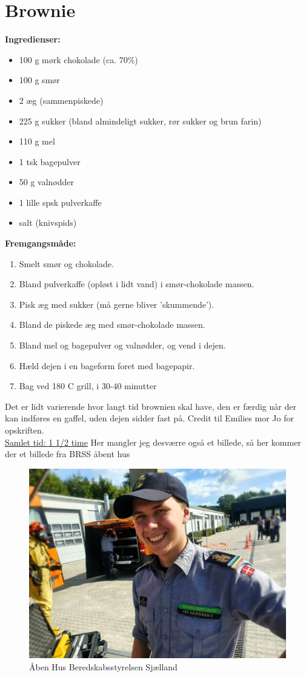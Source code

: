 \documentclass{book}
\begin{document}
\newpage \section{Brownie}
\begin{minipage}[t]{0.5\textwidth}
\textbf{Ingredienser:}
\begin{itemize}
  \item 100 g mørk chokolade (ca. 70\%)
  \item 100 g smør
  \item 2 æg (sammenpiskede)
  \item 225 g sukker (bland almindeligt sukker, rør sukker og brun farin)
  \item 110 g mel
  \item 1 tsk bagepulver
  \item 50 g valnødder
  \item 1 lille spsk pulverkaffe
  \item salt (knivspids)
\end{itemize}
\end{minipage}
\begin{minipage}[t]{0.5\textwidth}
\textbf{Fremgangsmåde:}
\begin{enumerate}
    \item Smelt smør og chokolade. 
    \item Bland pulverkaffe (opløst i lidt vand) i smør-chokolade massen.
    \item Pisk æg med sukker (må gerne bliver ’skummende’).
    \item Bland de piskede æg med smør-chokolade massen.
    \item Bland mel og bagepulver og valnødder, og vend i dejen.
    \item Hæld dejen i en bageform foret med bagepapir.
    \item Bag ved 180 \degree C grill, i 30-40 minutter
\end{enumerate}
\end{minipage}
Det er lidt varierende hvor langt tid brownien skal have, den er færdig når der kan indføres en gaffel, uden dejen sidder fast på. Credit til Emilies mor Jo for opskriften.
\\ \underline{Samlet tid: 1 1/2 time}
\newpage 
Her mangler jeg desværre også et billede, så her kommer der et billede fra BRSS åbent hus 
\begin{figure}
    \centering
    \includegraphics[width=0.5\linewidth]{BRSS.jpg}
    \caption{Åben Hus Beredskabsstyrelsen Sjælland}
\end{figure}
\end{document}

